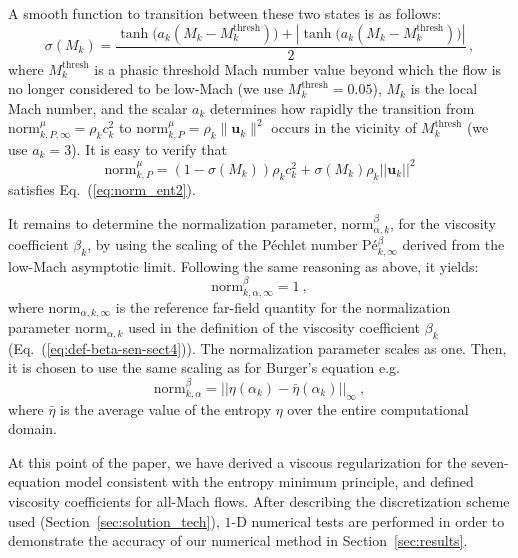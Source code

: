 \documentclass[preprint,10pt]{elsarticle}
\newcommand{\mbold}[1]{\boldsymbol#1}
\newcommand{\norm}{\textrm{norm}}
\newcommand{\Pe}{\textrm{P\'e}}
\newcommand{\eqt}[1]{Eq.~(\ref{#1})}                     %
\newcommand{\sct}[1]{Section~\ref{#1}}                   %
\begin{document}
A smooth function to transition between these two states is as follows: %
\begin{equation}
 \sigma(M_k) = \frac{\tanh\big(a_k(M_k-M_k^\text{thresh})\big) + | \tanh\big(a_k(M_k-M_k^\text{thresh})\big) | }{2} \,,
\end{equation}
where $M_k^\text{thresh}$ is a phasic threshold Mach number value beyond which the flow is no longer 
considered  to be low-Mach (we use $M_k^\text{thresh}=0.05$), $M_k$ is the local Mach number, 
and the scalar $a_k$ determines how rapidly the transition from  
$\norm_{k,P,\infty}^\mu= \rho_k c_k^2$ to $\norm_{k,P}^\mu=\rho_k \| \mbold u_k \|^2$ occurs in the vicinity of $M_k^\text{thresh}$ (we use $a_k = 3$). 
It is easy to verify that
\begin{equation}
\label{eq:norm_ent3}
\norm_{k,P}^\mu = (1-\sigma(M_k)) \rho_k c_k^2  + \sigma(M_k)  \rho_k ||\mbold u_k ||^2  
\end{equation}
satisfies \eqt{eq:norm_ent2}.

It remains to determine the normalization parameter, $\norm_{\alpha,k}^\beta$, for the viscosity coefficient $\beta_k$, by using the scaling of the P\'echlet number $\Pe_{k,\infty}^\beta$ derived from the low-Mach asymptotic limit. Following the same reasoning as above, it yields:
%
\begin{equation}
\label{eq:norm_relation_beta}
\norm_{k,\alpha,\infty}^\beta = 1 \ ,
\end{equation}
%
where $\norm_{\alpha,k,\infty}$ is the reference far-field quantity for the normalization parameter $\norm_{\alpha,k}$ used in the definition of the viscosity coefficient $\beta_k$ (\eqt{eq:def-beta-sen-sect4}). The normalization parameter scales as one. Then, it is chosen to use the same scaling as for Burger's equation \cite{jlg2} e.g.
%
\begin{equation}
\label{eq:norm_relation_beta2}
\norm_{k,\alpha}^\beta =  || \eta (\alpha_k) - \bar{\eta}(\alpha_k) ||_\infty\ ,
\end{equation}
%
where $\bar{\eta}$ is the average value of the entropy $\eta$ over the entire computational domain.

At this point of the paper, we have derived a viscous regularization for the seven-equation model consistent with the entropy minimum principle, and defined viscosity coefficients for all-Mach flows. After describing the discretization scheme used (\sct{sec:solution_tech}), $1$-D numerical tests are performed in order to demonstrate the accuracy of our numerical method in \sct{sec:results}.
\end{document}
